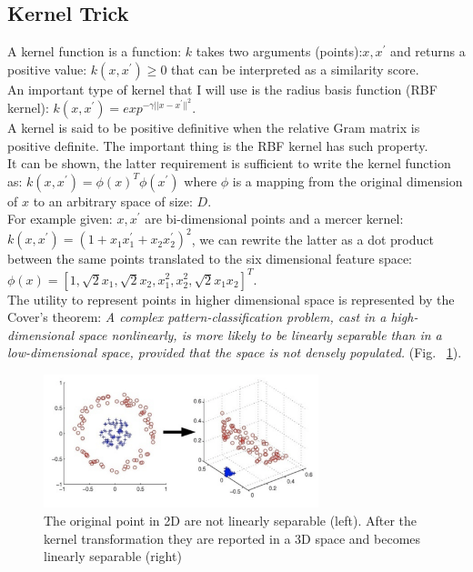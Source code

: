 \documentclass[LaM,binding=0.6cm]{sapthesis}
\begin{document}
\subsection{Kernel Trick}
A kernel function is a function: $k$ takes two arguments (points):$x,x^{'}$ and returns a positive value: $k(x,x^{'}) \geq0$ that can be interpreted as a similarity score.\\An important type of kernel that I will use is the radius basis function (RBF kernel): $k(x,x^{'})=exp^{-\gamma||x-x^{'}||^{2}}$.\\A kernel is said to be positive definitive when the relative Gram matrix is positive definite. The important thing is the RBF kernel has such property.\\It can be shown, the latter requirement is sufficient to write the kernel function as: $k(x,x^{'})=\phi(x)^{T}\phi(x^{'})$ where $\phi$ is a mapping from the original dimension of $x$ to an arbitrary space of size: $D$.\\For example given: $x,x^{'}$ are bi-dimensional points and a mercer kernel: $k(x,x^{'})=(1 + x_1x^{'}_1 + x_2x^{'}_2)^{2}$, we can rewrite the latter as a dot product between the same points translated to the six dimensional feature space: $\phi(x)=[1, \sqrt{2}x_1, \sqrt{2}x_2, x^{2}_1,x^{2}_2, \sqrt{2}x_1x_2]^{T}$.\\The utility to represent points in higher dimensional space is represented by the Cover's theorem: \textit{ A complex pattern-classification problem, cast in a high-dimensional space nonlinearly, is more likely to be linearly separable than in a low-dimensional space, provided that the space is not densely populated.} (Fig. ~\ref{fig:kerneltrick}).
\begin{figure}[H]  \centering
    \includegraphics[width=80mm,scale=0.7]{kerneltrick}
    \caption{The original point in 2D are not linearly separable (left). After the kernel transformation they are reported in a 3D space and becomes linearly separable (right)}
    \label{fig:kerneltrick}
\end{figure}
\end{document}
